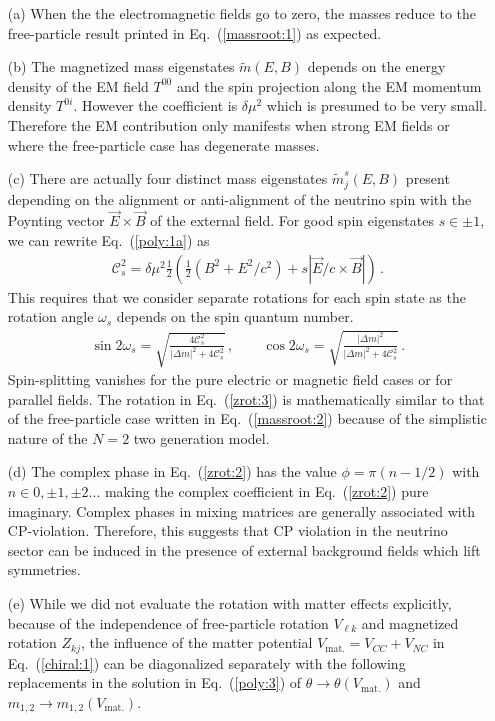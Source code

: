 \documentclass[addchapnum]{ws-rv961x669} %
\newcommand{\req}[1]{Eq.~(\ref{#1})}
\begin{document}
\begin{enumerate}[nosep]
    \item[(a)] When the the electromagnetic fields go to zero, the masses reduce to the free-particle result printed in \req{massroot:1} as expected.
    \item[(b)] The magnetized mass eigenstates $\widetilde m(E,B)$ depends on the energy density of the EM field $T^{00}$ and the spin projection along the EM momentum density $T^{0i}$. However the coefficient is $\delta\mu^{2}$ which is presumed to be very small. Therefore the EM contribution only manifests when strong EM fields or where the free-particle case has degenerate masses.
    \item[(c)] There are actually four distinct mass eigenstates $\widetilde m_{j}^{s}(E,B)$ present depending on the alignment or anti-alignment of the neutrino spin with the Poynting vector $\vec{E}\times\vec{B}$ of the external field. For good spin eigenstates $s\in\pm1$, we can rewrite \req{poly:1a} as
    \begin{align}
        \mathcal{C}^{2}_{s}=\delta\mu^{2}\frac{1}{2}\left(\frac{1}{2}(B^{2}+E^{2}/c^{2})+s|\vec{E}/c\times\vec{B}|\right)\,.
    \end{align}
    This requires that we consider separate rotations for each spin state as the rotation angle $\omega_{s}$ depends on the spin quantum number.
    \begin{align}
        \label{zrot:3}
        \sin2\omega_{s}=\sqrt{\frac{4\mathcal{C}_{s}^{2}}{|\Delta m|^{2}+4\mathcal{C}_{s}^{2}}}\,,\qquad
        \cos2\omega_{s}=\sqrt{\frac{|\Delta m|^{2}}{|\Delta m|^{2}+4\mathcal{C}_{s}^{2}}}\,.
    \end{align}
    Spin-splitting vanishes for the pure electric or magnetic field cases or for parallel fields. The rotation in \req{zrot:3} is mathematically similar to that of the free-particle case written in \req{massroot:2} because of the simplistic nature of the $N=2$ two generation model.
    \item[(d)] The complex phase in \req{zrot:2} has the value $\phi=\pi(n-1/2)$ with $n\in0,\pm1,\pm2...$ making the complex coefficient in \req{zrot:2} pure imaginary. Complex phases in mixing matrices are generally associated with CP-violation. Therefore, this suggests that CP violation in the neutrino sector can be induced in the presence of external background fields which lift symmetries.
    \item[(e)] While we did not evaluate the rotation with matter effects explicitly, because of the independence of free-particle rotation $V_{\ell k}$ and magnetized rotation $Z_{kj}$, the influence of the matter potential $V_\mathrm{mat.}=V_{CC}+V_{NC}$ in \req{chiral:1} can be diagonalized separately with the following replacements in the solution in \req{poly:3} of $\theta\rightarrow\theta(V_\mathrm{mat.})$ and $m_{1,2}\rightarrow m_{1,2}(V_\mathrm{mat.})$.
\end{enumerate}
\end{document}
